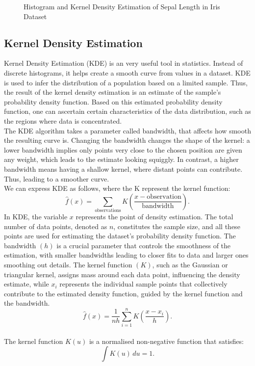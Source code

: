 \documentclass{article}\usepackage[]{graphicx}\usepackage[]{xcolor}
\newenvironment{knitrout}{}{} %
\numberwithin{equation}{section}
\begin{document}
\begin{figure}[htbp]
\begin{minipage}[b]{0.48\linewidth}
\begin{knitrout}
{}


\end{knitrout}
  \end{minipage}
  \caption{Histogram and Kernel Density Estimation of Sepal Length in Iris Dataset}
  \label{fig:iris-plots}
\end{figure}

\subsection{Kernel Density Estimation}

Kernel Density Estimation (KDE) is an very useful tool in statistics. Instead of discrete histograms, it helps create a smooth curve from values in a dataset. KDE is used to infer the distribution of a population based on a limited sample. Thus, the result of the kernel density estimation is an estimate of the sample's probability density function. Based on this estimated probability density function, one can ascertain certain characteristics of the data distribution, such as the regions where data is concentrated.\\

\noindent
The KDE algorithm takes a parameter called bandwidth, that affects how smooth the resulting curve is. Changing the bandwidth changes the shape of the kernel: a lower bandwidth implies only points very close to the chosen position are given any weight, which leads to the estimate looking squiggly. In contrast, a higher bandwidth means having a shallow kernel, where distant points can contribute. Thus, leading to a smoother curve. %
\\

\noindent
We can express KDE as follows, where the K represent the kernel function:
$$\hat{f}(x) = \sum_{\text{observations}} K\left(\frac{x - \text{observation}}{\text{bandwidth}}\right).$$
In KDE, the variable $x$ represents the point of density estimation. The total number of data points, denoted as $n$, constitutes the sample size, and all these points are used for estimating the dataset's probability density function. The bandwidth $(h)$ is a crucial parameter that controls the smoothness of the estimation, with smaller bandwidths leading to closer fits to data and larger ones smoothing out details. The kernel function $(K)$, such as the Gaussian or triangular kernel, assigns mass around each data point, influencing the density estimate, while $x_i$ represents the individual sample points that collectively contribute to the estimated density function, guided by the kernel function and the bandwidth\cite{wand1994kernel}.
$$\hat{f}(x) = \frac{1}{nh} \sum_{i=1}^{n} K\left(\frac{x - x_i}{h}\right).$$\\
The kernel function \( K(u) \) is a normalised non-negative function that satisfies:
\[ \int K(u) \, du = 1. \]
\end{document}
